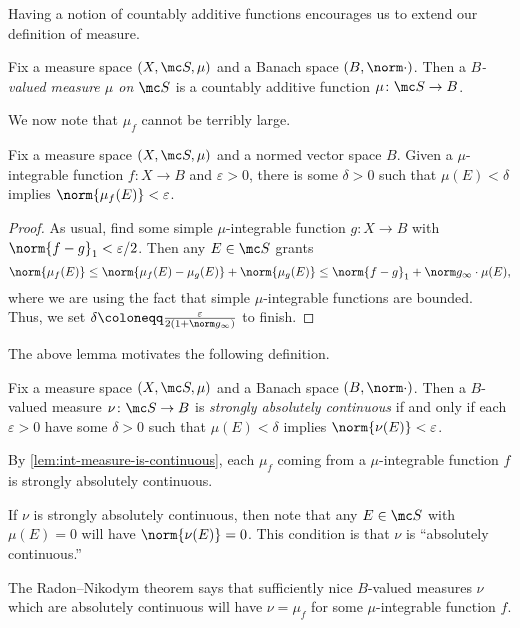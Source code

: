 \documentclass[../notes.tex]{subfiles}
\begin{document}
Having a notion of countably additive functions encourages us to extend our definition of measure.
\begin{definition}[Measure]
	Fix a measure space $(X,\mc S,\mu)$ and a Banach space $(B,\norm\cdot)$. Then a \textit{$B$-valued measure $\mu$ on $\mc S$} is a countably additive function $\mu\colon\mc S\to B$.
\end{definition}
We now note that $\mu_f$ cannot be terribly large.
\begin{lemma} \label{lem:int-measure-is-continuous}
	Fix a measure space $(X,\mc S,\mu)$ and a normed vector space $B$. Given a $\mu$-integrable function $f\colon X\to B$ and $\varepsilon>0$, there is some $\delta>0$ such that $\mu(E)<\delta$ implies $\norm{\mu_f(E)}<\varepsilon$.
\end{lemma}
\begin{proof}
	As usual, find some simple $\mu$-integrable function $g\colon X\to B$ with $\norm{f-g}_1<\varepsilon/2$. Then any $E\in\mc S$ grants
	\[\norm{\mu_f(E)}\le\norm{\mu_f(E)-\mu_g(E)}+\norm{\mu_g(E)}\le\norm{f-g}_1+\norm g_\infty\cdot\mu(E),\]
	where we are using the fact that simple $\mu$-integrable functions are bounded. Thus, we set $\delta\coloneqq\frac\varepsilon{2(1+\norm g_\infty)}$ to finish.
\end{proof}
The above lemma motivates the following definition.
\begin{definition}
	Fix a measure space $(X,\mc S,\mu)$ and a Banach space $(B,\norm\cdot)$. Then a $B$-valued measure $\nu\colon\mc S\to B$ is \textit{strongly absolutely continuous} if and only if each $\varepsilon>0$ have some $\delta>0$ such that $\mu(E)<\delta$ implies $\norm{\nu(E)}<\varepsilon$.
\end{definition}
\begin{example}
	By \autoref{lem:int-measure-is-continuous}, each $\mu_f$ coming from a $\mu$-integrable function $f$ is strongly absolutely continuous.
\end{example}
\begin{remark}
	If $\nu$ is strongly absolutely continuous, then note that any $E\in\mc S$ with $\mu(E)=0$ will have $\norm{\nu(E)}=0$. This condition is that $\nu$ is ``absolutely continuous.''
\end{remark}
\begin{remark}
	The Radon--Nikodym theorem says that sufficiently nice $B$-valued measures $\nu$ which are absolutely continuous will have $\nu=\mu_f$ for some $\mu$-integrable function $f$.
\end{remark}
\end{document}
